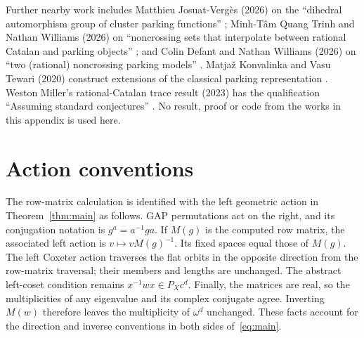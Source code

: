 \documentclass[11pt]{article}
\begin{document}
\begin{appendices}
Further nearby work includes Matthieu Josuat-Verg\`es (2026) on the
``dihedral automorphism group of cluster parking functions''
\cite[abstract]{JV2026}; Minh-T\^am Quang Trinh and Nathan Williams (2026)
on ``noncrossing sets that interpolate between rational Catalan and parking
objects'' \cite[abstract]{TW2026}; and Colin Defant and Nathan Williams
(2026) on ``two (rational) noncrossing parking models''
\cite[abstract]{DW2026}. Matja\v{z} Konvalinka and Vasu Tewari (2020)
construct extensions of the classical parking representation
\cite[abstract]{KT2020}. Weston Miller's rational-Catalan trace result
(2023) has the qualification ``Assuming standard conjectures''
\cite[abstract]{Miller2023}. No result, proof or code from the works in this
appendix is used here.

\section{Action conventions}\label{app:conventions}
The row-matrix calculation is identified with the left geometric
action in Theorem~\ref{thm:main} as follows. GAP
permutations act on the right, and its conjugation notation is
$g^a=a^{-1}ga$. If $M(g)$ is the computed row matrix, the associated
left action is $v\mapsto vM(g)^{-1}$. Its fixed spaces equal those
of $M(g)$. The left Coxeter action traverses the flat orbits in the
opposite direction from the row-matrix traversal; their members and
lengths are unchanged. The abstract left-coset condition remains
$x^{-1}wx\in P_Xc^d$. Finally, the matrices are real, so the
multiplicities of any eigenvalue and its complex conjugate agree.
Inverting $M(w)$ therefore leaves the multiplicity of $\omega^d$
unchanged. These facts account for the direction and inverse
conventions in both sides of~\eqref{eq:main}.

\end{appendices}
\end{document}
